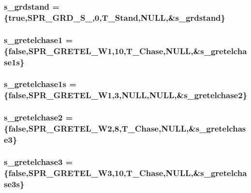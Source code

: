 \label{WL__ACT2_8C_ad4618db66286b9a721f5928dd2f9d3f2}
\hypertarget{WL__ACT2_8C_a919f07f4c0f399e351387cc6a7987554}{
\subsubsection[{s\_\-grdstand}]{ {\bf s\_\-grdstand} = \{true,SPR\_\-GRD\_\-S\_,0,T\_\-Stand,NULL,\&{\bf s\_\-grdstand}\}}}
\label{WL__ACT2_8C_a919f07f4c0f399e351387cc6a7987554}
\hypertarget{WL__ACT2_8C_a6d420f4e0ef48ab7a3e7b67721af7a1e}{
\subsubsection[{s\_\-gretelchase1}]{ {\bf s\_\-gretelchase1} = \{false,SPR\_\-GRETEL\_\-W1,10,T\_\-Chase,NULL,\&{\bf s\_\-gretelchase1s}\}}}
\label{WL__ACT2_8C_a6d420f4e0ef48ab7a3e7b67721af7a1e}
\hypertarget{WL__ACT2_8C_a6681e7c207323c033617bc41aac29db7}{
\subsubsection[{s\_\-gretelchase1s}]{ {\bf s\_\-gretelchase1s} = \{false,SPR\_\-GRETEL\_\-W1,3,NULL,NULL,\&{\bf s\_\-gretelchase2}\}}}
\label{WL__ACT2_8C_a6681e7c207323c033617bc41aac29db7}
\hypertarget{WL__ACT2_8C_aa65f0f83a848a34227fb2bb9e96348bc}{
\subsubsection[{s\_\-gretelchase2}]{ {\bf s\_\-gretelchase2} = \{false,SPR\_\-GRETEL\_\-W2,8,T\_\-Chase,NULL,\&{\bf s\_\-gretelchase3}\}}}
\label{WL__ACT2_8C_aa65f0f83a848a34227fb2bb9e96348bc}
\hypertarget{WL__ACT2_8C_a6706248520f9e3ccae440f57e44ab6a1}{
\subsubsection[{s\_\-gretelchase3}]{ {\bf s\_\-gretelchase3} = \{false,SPR\_\-GRETEL\_\-W3,10,T\_\-Chase,NULL,\&{\bf s\_\-gretelchase3s}\}}}
